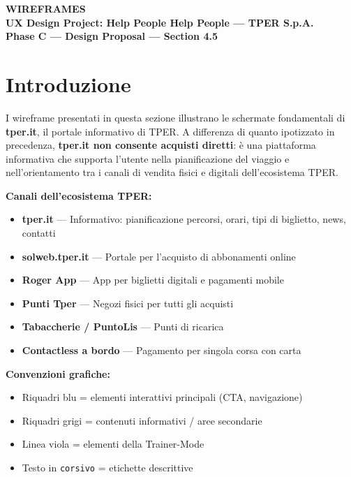 \documentclass[11pt,a4paper]{article}
\begin{document}
\begin{tcolorbox}[colback=primaryColor,colframe=primaryColor,arc=3mm,halign=center,valign=center,height=2.5cm]
    \color{white}\LARGE\bfseries WIREFRAMES \\[0.2cm]
    \color{white!80}\large UX Design Project: Help People Help People --- TPER S.p.A. \\[0.1cm]
    \color{white!60}\normalsize Phase C --- Design Proposal --- Section 4.5
\end{tcolorbox}

\vspace{0.3cm}

\section{Introduzione}

I wireframe presentati in questa sezione illustrano le schermate fondamentali di \textbf{tper.it}, il portale informativo di TPER. A differenza di quanto ipotizzato in precedenza, \textbf{tper.it non consente acquisti diretti}: è una piattaforma informativa che supporta l'utente nella pianificazione del viaggio e nell'orientamento tra i canali di vendita fisici e digitali dell'ecosistema TPER.

\vspace{0.2cm}
\textbf{Canali dell'ecosistema TPER:}
\begin{itemize}
    \item \textbf{tper.it} --- Informativo: pianificazione percorsi, orari, tipi di biglietto, news, contatti
    \item \textbf{solweb.tper.it} --- Portale per l'acquisto di abbonamenti online
    \item \textbf{Roger App} --- App per biglietti digitali e pagamenti mobile
    \item \textbf{Punti Tper} --- Negozi fisici per tutti gli acquisti
    \item \textbf{Tabaccherie / PuntoLis} --- Punti di ricarica
    \item \textbf{Contactless a bordo} --- Pagamento per singola corsa con carta
\end{itemize}

\vspace{0.2cm}
\textbf{Convenzioni grafiche:}
\begin{itemize}
    \item Riquadri blu = elementi interattivi principali (CTA, navigazione)
    \item Riquadri grigi = contenuti informativi / aree secondarie
    \item Linea viola = elementi della Trainer-Mode
    \item Testo in \texttt{corsivo} = etichette descrittive
\end{itemize}
\end{document}
